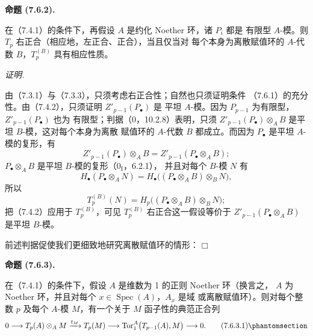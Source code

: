 \documentclass[UTF8,fontset=none,11pt,oneside,openany]{ctexbook}
\providecommand{\square}{\mdlgwhtsquare}
\newenvironment{proposition}[1][]{%
  \par\medskip\noindent\textbf{命题 (#1).}\ %
}{\par}
\newenvironment{proof}{%
  \par\smallskip\noindent\textit{证明.}\ %
}{\hfill$\square$\par}
\newcommand{\oldpage}[2][]{%
  \hypertarget{ega-source-page-#1-#2}{}%
  \marginnote{\scriptsize\textbf{#1}~|~#2}\ignorespaces}
\let\EGAOriginalLabel\label
\renewcommand{\label}[1]{\phantomsection\EGAOriginalLabel{#1}}
\begin{document}
\begin{proposition}[7.6.2]
在（7.4.1）的条件下，再假设 $A$ 是约化 Noether 环，诸 $P_i$ 都是
有限型 $A$-模。则 $T_p$ 右正合（相应地，左正合、正合），当且仅当对
每个本身为离散赋值环的 $A$-代数 $B$，$T_p^{(B)}$ 具有相应性质。
\end{proposition}

\begin{proof}
由（7.3.1）与（7.3.3），只须考虑右正合性；自然也只须证明条件
（7.6.1）的充分性。由（7.4.2），只须证明 $Z'_{p-1}(P_\bullet)$ 是
平坦 $A$-模。因为 $P_{p-1}$ 为有限型，$Z'_{p-1}(P_\bullet)$ 也为
有限型；判据（$0$，10.2.8）表明，只须
$Z'_{p-1}(P_\bullet)\otimes_A B$ 是平坦 $B$-模，这对每个本身为离散
赋值环的 $A$-代数 $B$ 都成立。而因为
$P_\bullet$ 是平坦 $A$-模的复形，有
\[
  Z'_{p-1}(P_\bullet)\otimes_A B
  =
  Z'_{p-1}(P_\bullet\otimes_A B);
\]
\oldpage[III]{193}
$P_\bullet\otimes_A B$ 是平坦 $B$-模的复形（$0_{\mathrm I}$，6.2.1），
并且对每个 $B$-模 $N$ 有
\[
  H_\bullet(P_\bullet\otimes_A N)
  =
  H_\bullet\bigl((P_\bullet\otimes_A B)\otimes_B N\bigr),
\]
所以
\[
  T_p^{(B)}(N)
  =
  H_p\bigl((P_\bullet\otimes_A B)\otimes_B N\bigr);
\]
把（7.4.2）应用于 $T_p^{(B)}$，可见 $T_p^{(B)}$ 右正合这一假设等价于
$Z'_{p-1}(P_\bullet\otimes_A B)$ 是平坦 $B$-模。

前述判据促使我们更细致地研究离散赋值环的情形：
\end{proof}

\begin{proposition}[7.6.3]
在（7.4.1）的条件下，假设 $A$ 是维数为 1 的正则 Noether 环（换言之，
$A$ 为 Noether 环，并且对每个 $x\in\operatorname{Spec}(A)$，$A_x$ 是域
或离散赋值环）。则对每个整数 $p$ 及每个 $A$-模 $M$，有一个关于 $M$
函子性的典范正合列
\[
  0
  \longrightarrow T_p(A)\otimes_A M
  \xrightarrow{t_M}T_p(M)
  \longrightarrow \operatorname{Tor}_1^A\bigl(T_{p-1}(A),M\bigr)
  \longrightarrow0.
  \tag{7.6.3.1}\label{III.7.6.3.1.fr}
\]
\end{proposition}
\end{document}
